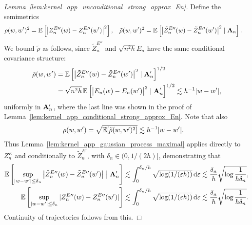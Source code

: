 \begin{proof}[Lemma~\ref{lem:kernel_app_unconditional_strong_approx_En}]

  Define the semimetrics
  \begin{align*}
    \rho(w, w')^2
    &=
    \mathbb{E}\left[
      \big|Z_n^{E\prime\prime}(w) - Z_n^{E\prime\prime}(w')\big|^2
    \right],
    &\tilde\rho(w, w')^2
    &=
    \mathbb{E}\left[
      \big|\tilde Z_n^{E\prime\prime}(w) - \tilde Z_n^{E\prime\prime}(w')\big|^2
      \mid \mathbf{A}_n
    \right].
  \end{align*}
  We bound $\tilde \rho$ as follows,
  since $\tilde Z_n^{E\dprime}$ and $\sqrt{n^2h} E_n$
  have the same conditional covariance structure:
  \begin{align*}
    \tilde\rho(w, w')
    &=
    \mathbb{E}\left[
      \big|\tilde Z_n^{E\prime\prime}(w) - \tilde Z_n^{E\prime\prime}(w')\big|^2
      \mid \mathbf{A}_n'
    \right]^{1/2} \\
    &=
    \sqrt{n^2 h} \,
    \mathbb{E}\left[
      \big|E_n(w) - E_n(w')\big|^2
      \mid \mathbf{A}_n'
    \right]^{1/2}
    \lesssim
    h^{-1}
    |w-w'|,
  \end{align*}
  uniformly in $\mathbf{A}_n'$,
  where the last line was shown in
  the proof of Lemma~\ref{lem:kernel_app_conditional_strong_approx_En}.
  Note that also
  \begin{align*}
    \rho(w, w')
    &=
    \sqrt{\mathbb{E}[\tilde \rho(w,w')^2]}
    \lesssim
    h^{-1}
    |w-w'|.
  \end{align*}
  Thus Lemma~\ref{lem:kernel_app_gaussian_process_maximal}
  applies directly to $Z_n^E$
  and conditionally to $\tilde Z_n^{E\prime}$,
  with $\delta_n \in (0, 1/(2h)]$,
  demonstrating that
  \begin{align*}
    \mathbb{E}\left[
      \sup_{|w-w'| \leq \delta_n}
      \big|\tilde Z_n^{E\prime\prime}(w) - \tilde Z_n^{E\prime\prime}(w')\big|
      \bigm\vert \mathbf{A}_n'
    \right]
    &\lesssim
    \int_0^{\delta_n / h}
    \sqrt{\log (1 / (\varepsilon h))}
    \,\mathrm{d}\varepsilon
    \lesssim
    \frac{\delta_n}{h}
    \sqrt{\log \frac{1}{h \delta_n}}, \\
    \mathbb{E}\left[
      \sup_{|w-w'| \leq \delta_n}
      |Z_n^{E\prime\prime}(w) - Z_n^{E\prime\prime}(w')|
    \right]
    &\lesssim
    \int_0^{\delta_n / h}
    \sqrt{\log (1 / (\varepsilon h))}
    \,\mathrm{d}\varepsilon
    \lesssim
    \frac{\delta_n}{h}
    \sqrt{\log \frac{1}{h \delta_n}}.
  \end{align*}
  Continuity of trajectories follows from this.



\end{proof}
